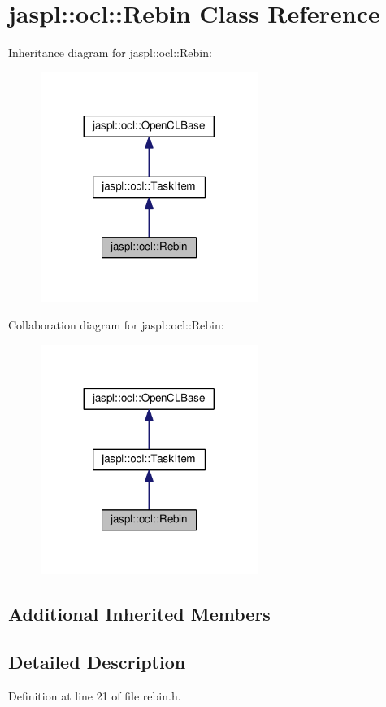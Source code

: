 \hypertarget{classjaspl_1_1ocl_1_1_rebin}{}\section{jaspl\+:\+:ocl\+:\+:Rebin Class Reference}
\label{classjaspl_1_1ocl_1_1_rebin}


Inheritance diagram for jaspl\+:\+:ocl\+:\+:Rebin\+:\nopagebreak
\begin{figure}[H]
\begin{center}
\leavevmode
\includegraphics[width=200pt]{classjaspl_1_1ocl_1_1_rebin__inherit__graph}
\end{center}
\end{figure}


Collaboration diagram for jaspl\+:\+:ocl\+:\+:Rebin\+:\nopagebreak
\begin{figure}[H]
\begin{center}
\leavevmode
\includegraphics[width=200pt]{classjaspl_1_1ocl_1_1_rebin__coll__graph}
\end{center}
\end{figure}
\subsection*{Additional Inherited Members}


\subsection{Detailed Description}


Definition at line 21 of file rebin.\+h.

